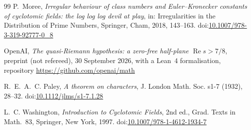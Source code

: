 \documentclass{aomart}
\numberwithin{equation}{section}
\theoremstyle{definition}
\renewcommand{\Re}{\operatorname{Re}}
\begin{document}
\begin{thebibliography}{99}
 P.~Moree, \emph{Irregular behaviour of class numbers and Euler--Kronecker
constants of cyclotomic fields: the log log log devil at play}, in: Irregularities in the
Distribution of Prime Numbers, Springer, Cham, 2018, 143--163. doi:\href{https://doi.org/10.1007/978-3-319-92777-0_8}{10.1007/978-3-319-92777-0\_8}

 OpenAI, \emph{The quasi-Riemann hypothesis: a zero-free half-plane
$\Re s>7/8$}, preprint (not refereed), 30 September 2026, with a Lean~4 formalisation, repository \url{https://github.com/openai/math}

 R.~E.~A.~C. Paley, \emph{A theorem on characters}, J. London Math. Soc.
s1-7 (1932), 28--32. doi:\href{https://doi.org/10.1112/jlms/s1-7.1.28}{10.1112/jlms/s1-7.1.28}

 L.~C. Washington, \emph{Introduction to Cyclotomic Fields}, 2nd ed., Grad. Texts
in Math.~83, Springer, New York, 1997. doi:\href{https://doi.org/10.1007/978-1-4612-1934-7}{10.1007/978-1-4612-1934-7}

\end{thebibliography}
\end{document}
